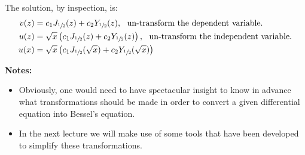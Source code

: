 The solution, by inspection, is:
\begin{align*}
v(z) &= c_1J_{\sfrac{1}{2}}(z) + c_2 Y_{\sfrac{1}{2}}(z), \ \ \text{un-transform the dependent variable.} \\
u(z) &= \sqrt{x}\left(c_1J_{\sfrac{1}{2}}(z) + c_2 Y_{\sfrac{1}{2}}(z) \right), \ \ \text{un-transform the independent variable.} \\
u(x) &= \sqrt{x}\left(c_1J_{\sfrac{1}{2}}(\sqrt{x}) + c_2Y_{\sfrac{1}{2}}(\sqrt{x})\right)
\end{align*}

\vspace{1.0cm}

\noindent\textbf{Notes:}
\begin{itemize}
\item Obviously, one would need to have spectacular insight to know in advance what transformations should be made in order to convert a given differential equation into Bessel's equation.  
\item In the next lecture we will make use of some tools that have been developed to simplify these transformations.
\end{itemize}

